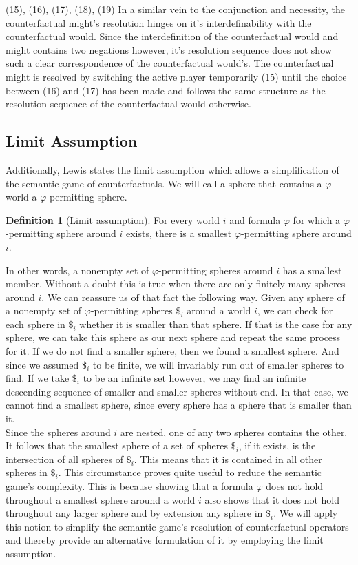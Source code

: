 \documentclass[a4paper,american,10pt]{paper}
\theoremstyle{definition}\newtheorem{definition}{Definition}
\begin{document}
\indent (15), (16), (17), (18), (19) In a similar vein to the conjunction and necessity, the counterfactual might's resolution hinges on it's interdefinability with the counterfactual would. Since the interdefinition of the counterfactual would and might contains two negations however, it's resolution sequence does not show such a clear correspondence of the counterfactual would's. The counterfactual might is resolved by switching the active player temporarily (15) until the choice between (16) and (17) has been made and follows the same structure as the resolution sequence of the counterfactual would otherwise.
\subsection{Limit Assumption}
Additionally, Lewis states the limit assumption which allows a simplification of the semantic game of counterfactuals. We will call a sphere that contains a $\varphi$-world a $\varphi$-permitting sphere.
\begin{definition}[Limit assumption]
For every world $i$ and formula $\varphi$ for which a $\varphi$-permitting sphere around $i$ exists, there is a smallest $\varphi$-permitting sphere around $i$.
\end{definition}
In other words, a nonempty set of $\varphi$-permitting spheres around $i$ has a smallest member. Without a doubt this is true when there are only finitely many spheres around $i$. We can reassure us of that fact the following way. Given any sphere of a nonempty set of $\varphi$-permitting spheres $\$_i$ around a world $i$, we can check for each sphere in $\$_i$ whether it is smaller than that sphere. If that is the case for any sphere, we can take this sphere as our next sphere and repeat the same process for it. If we do not find a smaller sphere, then we found a smallest sphere. And since we assumed $\$_i$ to be finite, we will invariably run out of smaller spheres to find.
If we take $\$_i$ to be an infinite set however, we may find an infinite descending sequence of smaller and smaller spheres without end. In that case, we cannot find a smallest sphere, since every sphere has a sphere that is smaller than it.\\
\indent Since the spheres around $i$ are nested, one of any two spheres contains the other. It follows that the smallest sphere of a set of spheres $\$_i$, if it exists, is the intersection of all spheres of $\$_i$. This means that it is contained in all other spheres in $\$_i$. This circumstance proves quite useful to reduce the semantic game's complexity. This is because showing that a formula $\varphi$ does not hold throughout a smallest sphere around a world $i$ also shows that it does not hold throughout any larger sphere and by extension any sphere in $\$_i$. We will apply this notion to simplify the semantic game's resolution of counterfactual operators and thereby provide an alternative formulation of it by employing the limit assumption.
\end{document}
